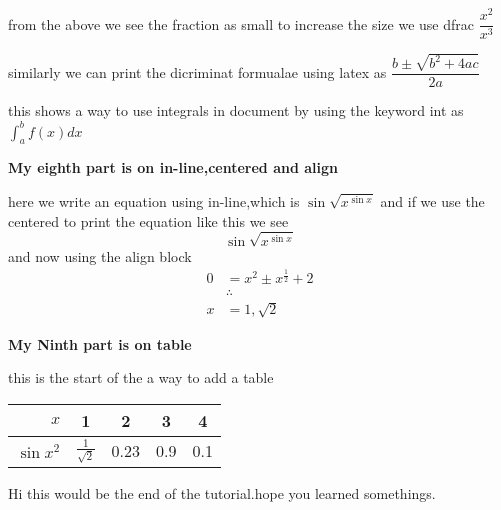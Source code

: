 \documentclass{article}
\begin{document}
    \noindent from the above we see the fraction as small to
    increase the size we use dfrac $\dfrac{x^2}{x^3}$

    \noindent similarly we can print the dicriminat formualae using
    latex as $\dfrac{b\pm\sqrt{b^2+4ac}}{2a}$
 
    \noindent this shows a way to use integrals in document by
    using the keyword int as $\int_a^bf(x)dx$
    
    \noindent \textbf{My eighth part is on in-line,centered and
    align}


    \noindent here we write an equation using in-line,which is
    $\sin{\sqrt{x^{\sin{x}}}}$ and if we use the centered to print
    the equation like this we see $$\sin{\sqrt{x^{\sin{x}}}}$$ and
    now using the align block 
    \begin{align*}
        0&= x^2\pm x^{\frac{1}{2}}+2 \\
         & \therefore \\ 
        x&= 1,\sqrt{2} 
    \end{align*}

    \noindent \textbf{My Ninth part is on table}

    \noindent this is the start of the a way to add a table
    \begin{center}
        \begin{tabular}{r|cccc}
            $x$ &1 &2 &3 &4 \\
            \hline
            $\sin{x^2}$&$\frac{1}{\sqrt{2}}$&0.23&0.9&0.1 
        \end{tabular}
    \end{center} 
    \hrulefill
    Hi this would be the end of the tutorial.hope you learned somethings.
\end{document}
